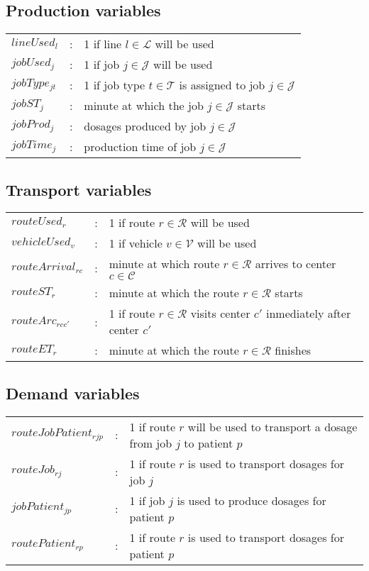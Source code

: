 \subsection{Production variables}

\begin{tabular}{p{30mm}lp{90mm}}
    $lineUsed_{l}$    & : & 1 if line $l \in \mathcal{L}$ will be used  \\  
    $jobUsed_{j}$    	& : & 1 if job $j \in \mathcal{J}$ will be used  \\  
    $jobType_{jt}$    & : & 1 if job type $t \in \mathcal{T}$ is assigned to job $j \in \mathcal{J}$ \\  
    $jobST_{j}$    		& : & minute at which the job $j \in \mathcal{J}$ starts \\  
    $jobProd_{j}$   	& : & dosages produced by job $j \in \mathcal{J}$ \\  
    $jobTime_{j}$   	& : & production time of job $j \in \mathcal{J}$ \\  
\end{tabular}
\bigskip

\subsection{Transport variables}

\begin{tabular}{p{30mm}lp{90mm}}
    $routeUsed_{r}$    	& : & 1 if route $r \in \mathcal{R}$ will be used  \\  
    $vehicleUsed_{v}$    & : & 1 if vehicle $v \in \mathcal{V}$ will be used  \\  
    $routeArrival_{rc}$    & : & minute at which route $r \in \mathcal{R}$ arrives to center $c \in \mathcal{C}$ \\  
    $routeST_{r}$    		& : & minute at which the route $r \in \mathcal{R}$ starts \\
    $routeArc_{rcc'}$   & : & 1 if route $r \in \mathcal{R}$ visits center $c'$ inmediately after center $c'$  \\
    $routeET_{r}$   		& : & minute at which the route $r \in \mathcal{R}$ finishes \\
\end{tabular}
\bigskip

\subsection{Demand variables}

\begin{tabular}{p{40mm}lp{80mm}}
    $routeJobPatient_{rjp}$    & : & 1 if route $r$ will be used to transport a dosage from job $j$ to patient $p$ \\  
    $routeJob_{rj}$    					& : & 1 if route $r$ is used to transport dosages for job $j$ \\  
    $jobPatient_{jp}$    				& : & 1 if job $j$ is used to produce dosages for patient $p$ \\  
    $routePatient_{rp}$    			& : & 1 if route $r$ is used to transport dosages for patient $p$\\
\end{tabular}
\bigskip


